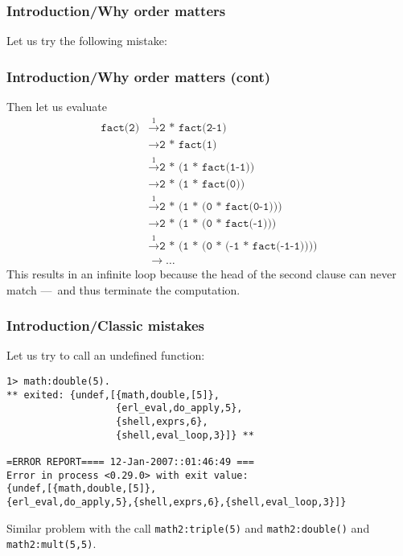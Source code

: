 %
\begin{frame}
\frametitle{Introduction/Why order matters}

Let us try the following mistake:

\end{frame}

%
\begin{frame}
\frametitle{Introduction/Why order matters (cont)}

Then let us evaluate
\begin{align*}
\texttt{fact(2)}
  & \stackrel{1}{\longrightarrow} \texttt{2 * fact(2-1)}\\
  & \longrightarrow \texttt{2 * fact(1)}\\
  & \stackrel{1}{\longrightarrow} \texttt{2 * (1 * fact(1-1))}\\
  & \longrightarrow \texttt{2 * (1 * fact(0))}\\
  & \stackrel{1}{\longrightarrow} \texttt{2 * (1 * (0 * fact(0-1)))}\\
  & \longrightarrow \texttt{2 * (1 * (0 * fact(-1)))}\\
  & \stackrel{1}{\longrightarrow} \texttt{2 * (1 * (0 * (-1 *
  fact(-1-1))))}\\
  & \longrightarrow \ldots
\end{align*}
This results in an infinite loop because the head of the second clause
can never match ---~and thus terminate the computation.

\end{frame}

%
\begin{frame}[containsverbatim]
\frametitle{Introduction/Classic mistakes}

Let us try to call an undefined function:
{\small
\begin{verbatim}
1> math:double(5).
** exited: {undef,[{math,double,[5]},
                   {erl_eval,do_apply,5},
                   {shell,exprs,6},
                   {shell,eval_loop,3}]} **

=ERROR REPORT==== 12-Jan-2007::01:46:49 ===
Error in process <0.29.0> with exit value:
{undef,[{math,double,[5]},
{erl_eval,do_apply,5},{shell,exprs,6},{shell,eval_loop,3}]}
\end{verbatim}
}

Similar problem with the call \texttt{math2:triple(5)} and
\texttt{math2:double()} and \texttt{math2:mult(5,5)}.

\end{frame}

